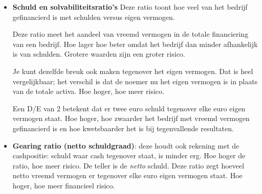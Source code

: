 \documentclass[a4paper,11pt]{article}
\begin{document}
\begin{description}
\begin{itemize}


              \item \textbf{Schuld en solvabiliteitsratio's}
                    Deze ratio toont hoe veel van het bedrijf gefinancierd is
                    met schulden versus eigen vermogen.

                    {Deze ratio meet het aandeel van vreemd vermogen
                        in de totale financiering van een bedrijf. Hoe lager hoe beter
                        omdat het bedrijf dan minder afhankelijk is van schulden.
                        Grotere waarden zijn een groter risico.
                    }

                    Je kunt dezelfde breuk ook maken tegenover het eigen vermogen. Dat is heel vergelijkbaar;
                    het verschil is dat de noemer nu het eigen vermogen is in plaats van de totale activa.
                    Hoe hoger, hoe meer risico.

                    {Een D/E van 2 betekent dat er twee euro schuld tegenover elke euro eigen vermogen staat.
                        Hoe hoger, hoe zwaarder het bedrijf met vreemd vermogen gefinancierd is en hoe kwetsbaarder
                        het is bij tegenvallende resultaten.}

              \item \textbf{Gearing ratio (netto schuldgraad)}:
                    deze houdt ook rekening met de cashpositie: schuld waar cash tegenover staat,
                    is minder erg.
                    Hoe hoger de ratio, hoe meer risico.
                    {De teller is de \emph{netto} schuld. Deze ratio zegt hoeveel netto vreemd vermogen er
                        tegenover elke euro eigen vermogen staat. Hoe hoger, hoe meer financieel risico.}


\end{itemize}
\end{description}
\end{document}
